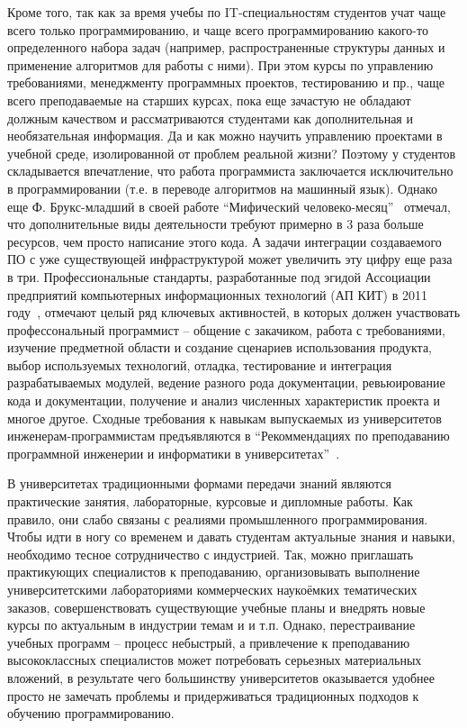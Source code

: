 \documentclass[a5paper]{article}
\begin{document}
Кроме того, так как за время учебы по IT-специальностям студентов учат чаще всего только  программированию, и чаще всего программированию  какого-то определенного набора задач (например, распространенные структуры данных и применение алгоритмов для работы с ними). При этом курсы по управлению требованиями, менеджменту программных проектов, тестированию и пр., чаще всего преподаваемые на старших курсах, пока еще зачастую не обладают должным качеством и рассматриваются студентами как дополнительная и необязательная информация. Да и как можно научить управлению проектами в учебной среде, изолированной от проблем реальной жизни? Поэтому у студентов складывается впечатление, что работа программиста заключается исключительно в программировании  (т.е. в переводе алгоритмов на машинный язык). Однако еще Ф. Брукс-младший в своей работе ``Мифический человеко-месяц''~\cite{brooks} отмечал, что дополнительные виды деятельности требуют примерно в 3 раза больше ресурсов, чем просто написание этого кода. А задачи интеграции создаваемого ПО с уже существующей инфраструктурой может увеличить эту цифру еще раза в три. Профессиональные стандарты, разработанные под эгидой Ассоциации предприятий компьютерных информационных технологий (АП КИТ) в 2011 году~\cite{apkit},  отмечают целый ряд ключевых активностей, в которых должен участвовать профессональный программист -- общение с закачиком, работа с требованиями, изучение предметной области и создание сценариев использования продукта, выбор используемых технологий, отладка, тестирование и интеграция разрабатываемых модулей, ведение разного рода документации, ревьюирование кода и документации, получение и анализ численных характеристик проекта и многое другое. Сходные требования к навыкам  выпускаемых из университетов инженерам-программистам предъявляются в ``Рекоммендациях по преподаванию программной инженерии и информатики в университетах''~\cite{curriculum}. 

В университетах традиционными формами передачи знаний  являются практические занятия, лабораторные, курсовые и дипломные работы. Как правило, они слабо связаны с реалиями промышленного программирования. Чтобы идти в ногу со временем и давать студентам актуальные знания и навыки, необходимо тесное сотрудничество с индустрией. Так, можно приглашать практикующих специалистов к преподаванию, организовывать выполнение университетскими лабораториями коммерческих наукоёмких тематических заказов, совершенствовать существующие учебные планы и внедрять новые курсы по актуальным в индустрии темам и и т.п. Однако, перестраивание учебных программ -- процесс небыстрый, а привлечение к преподаванию высококлассных специалистов может потребовать серьезных материальных вложений, в результате чего большинству университетов оказывается удобнее просто не замечать проблемы и придерживаться традиционных подходов к обучению программированию.
\end{document}
